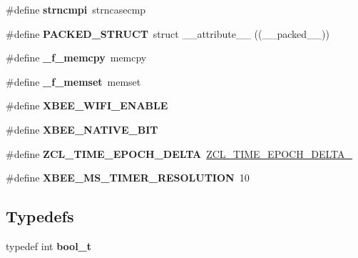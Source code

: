 \begin{DoxyCompactItemize}
\mbox{\label{group__hal__posix_gad3a1fdce8f91caabe3b9aaa93cb69044}} 
\#define {\bfseries strncmpi}~strncasecmp
\item 
\mbox{\label{group__hal__posix_gafa9179779c676eed926a35c4ab5fe5b5}} 
\#define {\bfseries P\+A\+C\+K\+E\+D\+\_\+\+S\+T\+R\+U\+CT}~struct \+\_\+\+\_\+attribute\+\_\+\+\_\+ ((\+\_\+\+\_\+packed\+\_\+\+\_\+))
\item 
\mbox{\label{group__hal__posix_ga3ee5b5bde5321e97420753cf13ce9c1b}} 
\#define {\bfseries \+\_\+f\+\_\+memcpy}~memcpy
\item 
\mbox{\label{group__hal__posix_ga210604a4d70c1421599afca049c8dc55}} 
\#define {\bfseries \+\_\+f\+\_\+memset}~memset
\item 
\mbox{\label{group__hal__posix_ga7e9a5ad096612667f1abe02fe20e3a25}} 
\#define {\bfseries X\+B\+E\+E\+\_\+\+W\+I\+F\+I\+\_\+\+E\+N\+A\+B\+LE}
\item 
\mbox{\label{group__hal__posix_ga422c69254f74ee55358b35d9eba96602}} 
\#define {\bfseries X\+B\+E\+E\+\_\+\+N\+A\+T\+I\+V\+E\+\_\+B\+IT}
\item 
\mbox{\label{group__hal__posix_ga503caf44f78cc52dc196c413cd6c78ab}} 
\#define {\bfseries Z\+C\+L\+\_\+\+T\+I\+M\+E\+\_\+\+E\+P\+O\+C\+H\+\_\+\+D\+E\+L\+TA}~\hyperlink{group__hal_ga735b0974380a73e9d7a12a1f199a5921}{Z\+C\+L\+\_\+\+T\+I\+M\+E\+\_\+\+E\+P\+O\+C\+H\+\_\+\+D\+E\+L\+T\+A\+\_}
\item 
\mbox{\label{group__hal__posix_ga5cbeea4d9344138b657f78ad38813584}} 
\#define {\bfseries X\+B\+E\+E\+\_\+\+M\+S\+\_\+\+T\+I\+M\+E\+R\+\_\+\+R\+E\+S\+O\+L\+U\+T\+I\+ON}~10
\end{DoxyCompactItemize}
\subsection*{Typedefs}
\begin{DoxyCompactItemize}
\item 
\mbox{\label{group__hal__posix_ga812d16e5494522586b3784e55d479912}} 
typedef int {\bfseries bool\+\_\+t}
\end{DoxyCompactItemize}

